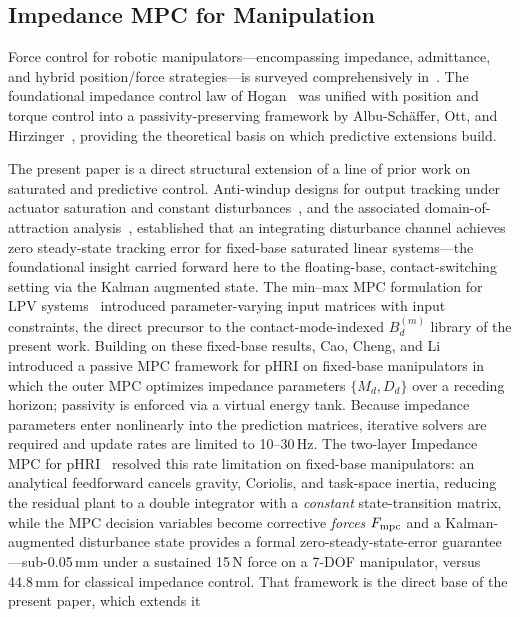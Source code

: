 \subsection{Impedance MPC for Manipulation}

Force control for robotic manipulators---encompassing impedance, admittance,
and hybrid position/force strategies---is surveyed comprehensively
in~\cite{villani2016force}.
The foundational impedance control law of Hogan~\cite{hogan1985impedance}
was unified with position and torque control into a passivity-preserving
framework by Albu-Sch\"{a}ffer, Ott, and
Hirzinger~\cite{albu2007unified}, providing the theoretical basis on which
predictive extensions build.

The present paper is a direct structural extension of a line of prior
work on saturated and predictive control.
Anti-windup designs for output tracking under actuator saturation and
constant disturbances~\cite{cao2004antiwindup}, and the associated
domain-of-attraction analysis~\cite{cao2002antiwindup}, established that an
integrating disturbance channel achieves zero steady-state tracking error
for fixed-base saturated linear systems---the foundational insight carried
forward here to the floating-base, contact-switching setting via the Kalman
augmented state.
The min--max MPC formulation for LPV systems~\cite{cao2005minmax} introduced
parameter-varying input matrices with input constraints, the direct
precursor to the contact-mode-indexed $B_d^{(m)}$ library of the present
work.
Building on these fixed-base results, Cao, Cheng, and
Li~\cite{cao2023passive} introduced a passive MPC framework for pHRI on
fixed-base manipulators in which the outer MPC optimizes impedance
parameters $\{M_d,D_d\}$ over a receding horizon; passivity is enforced via
a virtual energy tank.
Because impedance parameters enter nonlinearly into the prediction matrices,
iterative solvers are required and update rates are limited to 10--30\,Hz.
The two-layer Impedance MPC for pHRI~\cite{cao2026impedance} resolved this
rate limitation on fixed-base manipulators: an analytical feedforward
cancels gravity, Coriolis, and task-space inertia, reducing the residual
plant to a double integrator with a \emph{constant} state-transition
matrix, while the MPC decision variables become corrective \emph{forces}
$F_{\text{mpc}}$ and a Kalman-augmented disturbance state provides a formal
zero-steady-state-error guarantee---sub-0.05\,mm under a sustained 15\,N
force on a 7-DOF manipulator, versus 44.8\,mm for classical impedance
control.
That framework is the direct base of the present paper, which extends it
